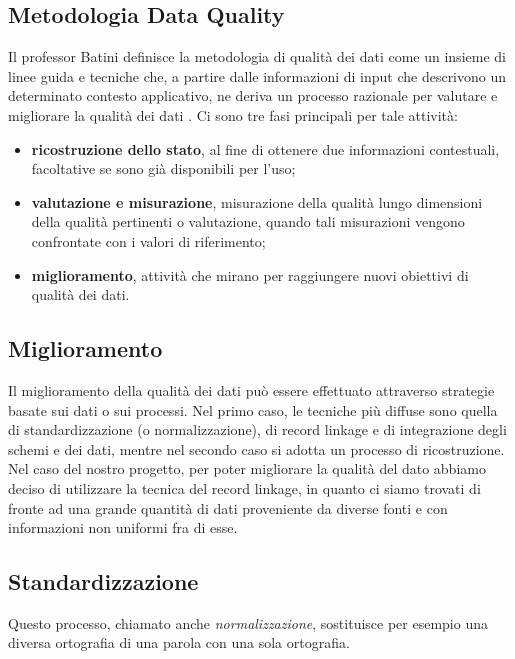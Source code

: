\documentclass[a4paper,12pt]{article}
\begin{document}
\subsection{Metodologia Data Quality}

Il professor Batini definisce la metodologia di qualità dei dati come un insieme di linee guida e tecniche che, a partire dalle informazioni di input che descrivono un determinato contesto applicativo, ne deriva un processo razionale per valutare e migliorare la qualità dei dati \cite{10.1145/1541880.1541883}. Ci sono tre fasi principali per tale attività:
\begin{itemize}
\item \textbf{ricostruzione dello stato}, al fine di ottenere due informazioni contestuali, facoltative se sono già disponibili per l'uso;
\item \textbf{valutazione e misurazione}, misurazione della qualità lungo dimensioni della qualità pertinenti o valutazione, quando tali misurazioni vengono confrontate con i valori di riferimento;
\item \textbf{miglioramento}, attività che mirano per raggiungere nuovi obiettivi di qualità dei dati.
\end{itemize}

\subsection{Miglioramento}

Il miglioramento della qualità dei dati può essere effettuato attraverso strategie basate sui dati o sui processi. Nel primo caso, le tecniche più diffuse sono quella di standardizzazione (o normalizzazione), di record linkage e di integrazione degli schemi e dei dati, mentre nel secondo caso si adotta un processo di ricostruzione. Nel caso del nostro progetto, per poter migliorare la qualità del dato abbiamo deciso di utilizzare la tecnica del record linkage, in quanto ci siamo trovati di fronte ad una grande quantità di dati proveniente da diverse fonti e con informazioni non uniformi fra di esse.

\subsection{Standardizzazione}

Questo processo, chiamato anche \textit{normalizzazione}, sostituisce per esempio una diversa ortografia di una parola con una sola ortografia. %
\end{document}
